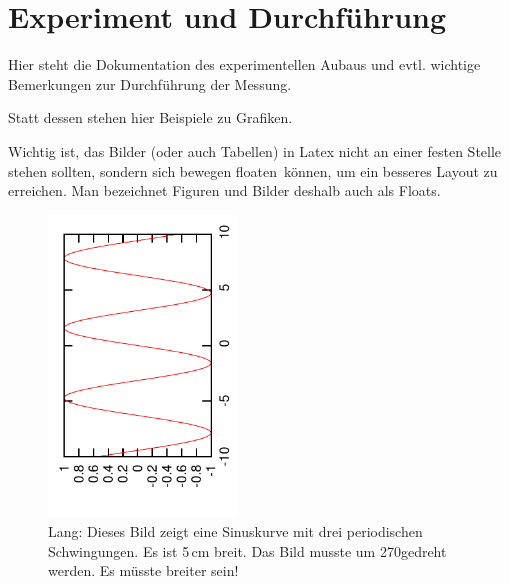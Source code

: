 \section{Experiment und Durchf\"uhrung}
Hier steht die Dokumentation des experimentellen Aubaus und evtl. wichtige 
Bemerkungen zur Durchf\"uhrung der Messung.

Statt dessen stehen hier Beispiele zu Grafiken.

Wichtig ist, das Bilder (oder auch Tabellen) in Latex nicht an einer festen Stelle stehen sollten, sondern sich bewegen \glqq floaten\grqq\ können, um
ein besseres Layout zu erreichen. Man bezeichnet Figuren und Bilder deshalb auch als Floats.

\begin{figure}[tbp]
 \centering
 \includegraphics[angle=270, width=5cm]{sinus}
 \caption[Kurz: Eine Sinuskurve]
 {Lang: Dieses Bild zeigt eine Sinuskurve mit 
drei periodischen Schwingungen. Es ist 5\,cm breit. Das Bild musste um 
270\textdegree  gedreht werden. Es müsste breiter sein!}
\label{fig:sinus}
\end{figure}


